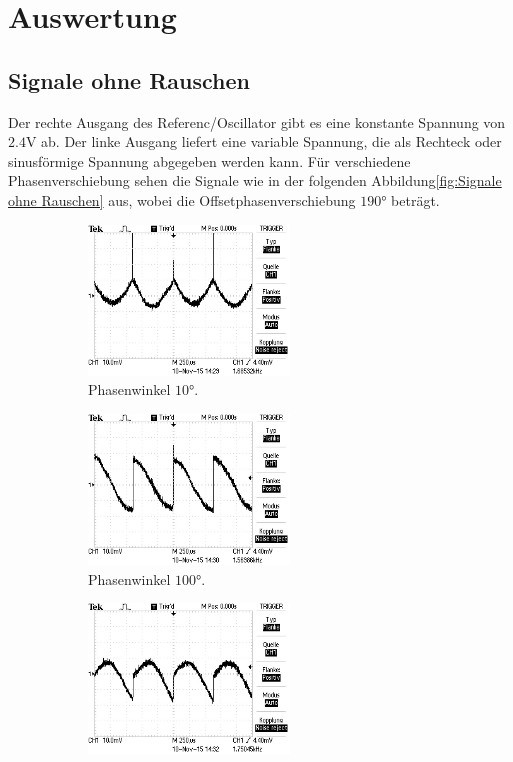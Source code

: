 \section{Auswertung}
\label{sec:Auswertung}
\subsection{Signale ohne Rauschen}
\label{sec:Signale ohne Rauschen}
Der rechte Ausgang des Referenc/Oscillator gibt es eine konstante Spannung
von $2.4\si{\volt}$ ab. Der linke Ausgang liefert eine variable Spannung, die
als Rechteck oder sinusförmige Spannung abgegeben werden kann. Für verschiedene
Phasenverschiebung sehen die Signale wie in der folgenden
Abbildung\eqref{fig:Signale ohne Rauschen} aus, wobei die Offsetphasenverschiebung
 $190°$ beträgt.
\begin{figure}
\centering
\begin{subfigure}{0.48\textwidth}
\centering
\includegraphics[height=4cm]{Bilder/or/or10.JPG}
\caption{Phasenwinkel $10°$.}
\label{fig:orp10}
\end{subfigure}
\begin{subfigure}{0.48\textwidth}
\centering
\includegraphics[height=4cm]{Bilder/or/or100.JPG}
\caption{Phasenwinkel $100°$.}
\label{fig:orp100}
\end{subfigure}
\begin{subfigure}{0.48\textwidth}
\centering
\includegraphics[height=4cm]{Bilder/or/or150.JPG}

\end{subfigure}
\end{figure}
